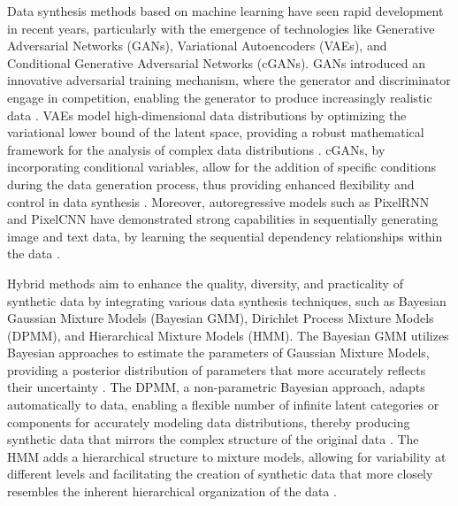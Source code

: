 \documentclass[final,3p,times]{elsarticle}
\begin{document}
Data synthesis methods based on machine learning have seen rapid 
development in recent years, particularly with the emergence of 
technologies like Generative Adversarial Networks (GANs), Variational 
Autoencoders (VAEs), and Conditional Generative Adversarial Networks 
(cGANs). GANs introduced an innovative adversarial training mechanism, 
where the generator and discriminator engage in competition, enabling 
the generator to produce increasingly realistic data \cite{bib38}. VAEs 
model high-dimensional data distributions by optimizing the 
variational lower bound of the latent space, providing a robust 
mathematical framework for the analysis of complex data 
distributions \cite{bib39}. cGANs, by incorporating conditional variables, 
allow for the addition of specific conditions during the data 
generation process, thus providing enhanced flexibility and control 
in data synthesis \cite{bib41,bib42}. Moreover, autoregressive models such as 
PixelRNN and PixelCNN have demonstrated strong capabilities in 
sequentially generating image and text data, by learning the 
sequential dependency relationships within the data \cite{bib43,bib44}.

Hybrid methods aim to enhance the quality, diversity, and 
practicality of synthetic data by integrating various data synthesis 
techniques, such as Bayesian Gaussian Mixture Models (Bayesian GMM), 
Dirichlet Process Mixture Models (DPMM), and Hierarchical Mixture 
Models (HMM). The Bayesian GMM utilizes Bayesian approaches to 
estimate the parameters of Gaussian Mixture Models, providing a 
posterior distribution of parameters that more accurately reflects 
their uncertainty \cite{bib46,bib47}. The DPMM, a non-parametric Bayesian 
approach, adapts automatically to data, enabling a flexible number 
of infinite latent categories or components for accurately modeling 
data distributions, thereby producing synthetic data that mirrors 
the complex structure of the original data \cite{bib49}. The HMM adds a 
hierarchical structure to mixture models, allowing for variability 
at different levels and facilitating the creation of synthetic data 
that more closely resembles the inherent hierarchical organization of 
the data \cite{bib51}.
\end{document}
